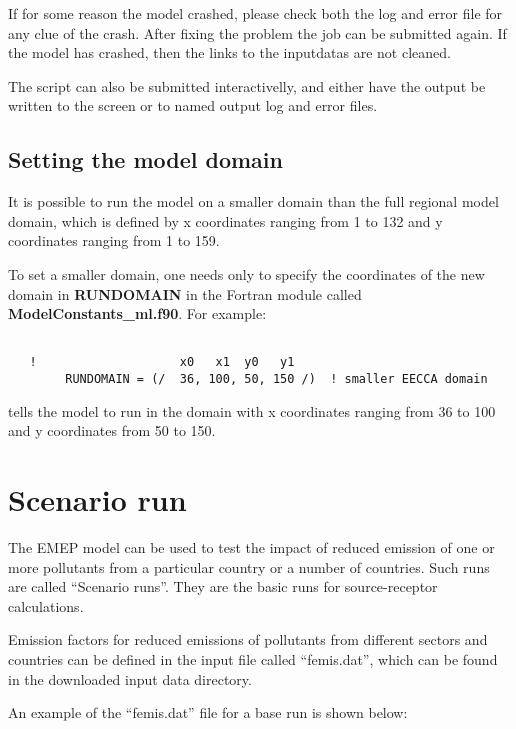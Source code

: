 If for some reason the model crashed, please check both the log and error file for any 
clue of the crash. After fixing the problem the job can be submitted again. If the 
model has crashed, then the links to the inputdatas are not cleaned. 

The script can also be submitted interactivelly, and either have the output be written to the screen or to 
named output log and error files. 
 


\subsection{Setting the model domain}

It is possible to run the model on a smaller domain than the full
regional model domain, which is defined by  x coordinates ranging
from 1 to 132 and y coordinates ranging from 1 to 159. 

To set a smaller domain, one needs only to specify the
coordinates of the new domain in {\bf RUNDOMAIN} in the Fortran module
called {\bf ModelConstants\_ml.f90}. For example:


\begin{verbatim}
  
   !                    x0   x1  y0   y1
        RUNDOMAIN = (/  36, 100, 50, 150 /)  ! smaller EECCA domain

\end{verbatim}

tells the model to run in the domain with x coordinates ranging from
36 to 100 and y coordinates from 50 to 150.\\ 

\section{Scenario run}

The EMEP  model can be used to test the impact of reduced emission of
one or more pollutants from a particular country or a number of
countries.  Such runs are called ``Scenario runs''. They are the basic
runs for source-receptor calculations.


Emission factors for reduced emissions of pollutants from different
sectors and countries can be defined in the input file called
``femis.dat'', which can be found in the downloaded input data
directory.

An example of the ``femis.dat'' file for a base run is shown below:

